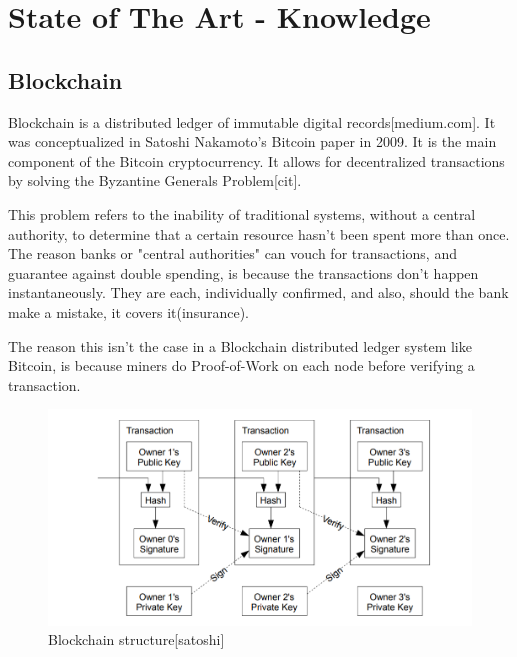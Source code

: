 \section{State of The Art - Knowledge}
\subsection{Blockchain}
Blockchain is a distributed ledger of immutable digital records[medium.com]. It was conceptualized in Satoshi Nakamoto's Bitcoin paper in 2009. It is the main component of the Bitcoin cryptocurrency. It allows for decentralized transactions by solving the Byzantine Generals Problem[cit].\par 
This problem refers to the inability of traditional systems, without a central authority, to determine that a certain resource hasn't been spent more than once. The reason banks or "central authorities" can vouch for transactions, and guarantee against double spending, is because the transactions don't happen instantaneously. They are each, individually confirmed, and also, should the bank make a mistake, it covers it(insurance).\par 
The reason this isn't the case in a Blockchain distributed ledger system like Bitcoin, is because miners do Proof-of-Work on each node before verifying a transaction.
\begin{figure}
\includegraphics[width=6in]{hashes.png}
\caption{Blockchain structure[satoshi]}
\end{figure}

